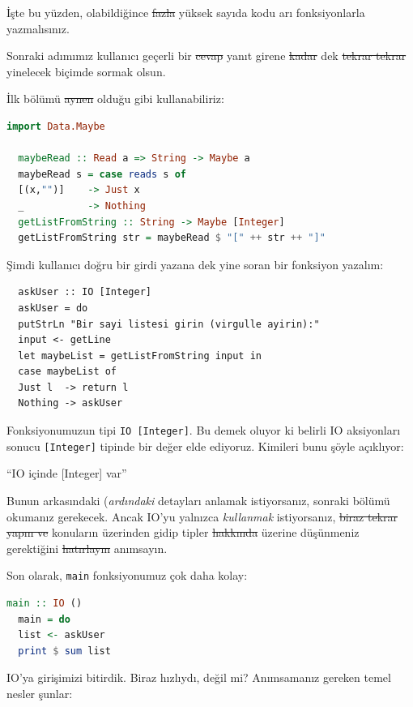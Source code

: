 \documentclass[a4paper,14pt,openany]{extbook} %
\let\emph\textit
\begin{document}
İşte bu yüzden, olabildiğince \st{fazla} yüksek sayıda kodu arı fonksiyonlarla
yazmalısınız.

Sonraki adımımız kullanıcı geçerli bir \st{cevap} yanıt girene \st{kadar} dek
\st{tekrar tekrar} yinelecek biçimde sormak olsun.

İlk bölümü \st{aynen} olduğu gibi kullanabiliriz:

\begin{lstlisting}[language=Haskell]
  import Data.Maybe

  maybeRead :: Read a => String -> Maybe a
  maybeRead s = case reads s of
  [(x,"")]    -> Just x
  _           -> Nothing
  getListFromString :: String -> Maybe [Integer]
  getListFromString str = maybeRead $ "[" ++ str ++ "]"
\end{lstlisting}

Şimdi kullanıcı doğru bir girdi yazana dek yine soran bir fonksiyon
yazalım:

\begin{lstlisting}
  askUser :: IO [Integer]
  askUser = do
  putStrLn "Bir sayi listesi girin (virgulle ayirin):"
  input <- getLine
  let maybeList = getListFromString input in
  case maybeList of
  Just l  -> return l
  Nothing -> askUser
\end{lstlisting}

Fonksiyonumuzun tipi \lstinline!IO [Integer]!. Bu demek oluyor ki
belirli IO aksiyonları sonucu \lstinline![Integer]! tipinde bir değer
elde ediyoruz. Kimileri bunu şöyle açıklıyor:

``IO içinde [Integer] var''

Bunun arkasındaki (\emph{ardındaki} detayları anlamak istiyorsanız, sonraki bölümü
okumanız gerekecek. Ancak IO'yu yalnızca \emph{kullanmak} istiyorsanız,
\st{biraz tekrar yapın ve} konuların üzerinden gidip tipler \st{hakkında} üzerine
düşünmeniz gerektiğini \st{hatırlayın} anımsayın.

Son olarak, \lstinline!main! fonksiyonumuz çok daha kolay:

\begin{lstlisting}[language=Haskell]
  main :: IO ()
  main = do
  list <- askUser
  print $ sum list
\end{lstlisting}

IO'ya girişimizi bitirdik. Biraz hızlıydı, değil mi? Anımsamanız
gereken temel nesler şunlar:
\end{document}
